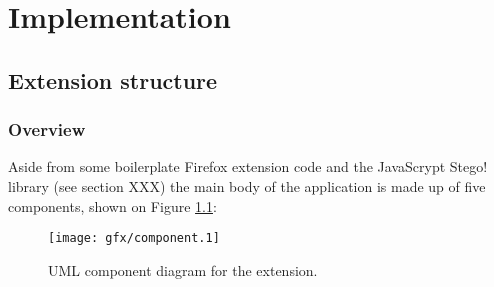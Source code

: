 \chapter{Implementation}\label{ch:implementation}

\section{Extension structure}


\subsection{Overview}

    Aside from some boilerplate Firefox extension code and the JavaScrypt Stego! library (see section XXX) the main body of the application is made up of five components, shown on Figure \ref{uml:component}:

    \begin{figure}[tbph]
        \begin{center}
                \texttt{[image: gfx/component.1]}
            \caption{UML component diagram for the extension.}
            \label{uml:component}
        \end{center}
    \end{figure}
    

